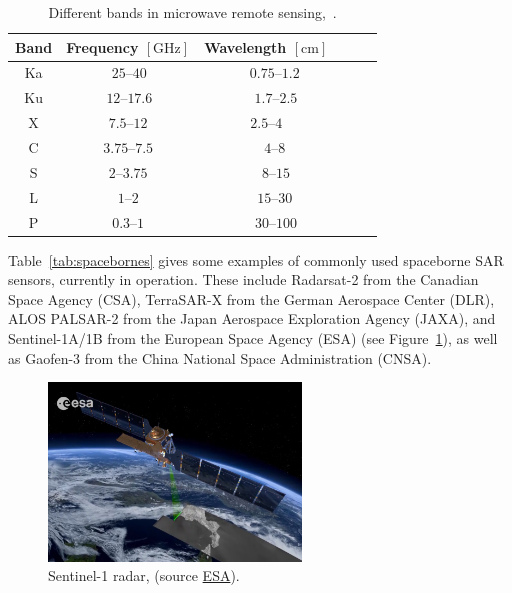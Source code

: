 \setlength{\tabcolsep}{6.0pt}
\begin{table}[!htb]
\caption[Different bands in microwave remote sensing]{\label{tab:bands}Different bands in microwave remote sensing,~\citep{Moreira2013}.}
\centering
\begin{tabular}[t]{cccccc}
\toprule
 \textbf{Band} & \multicolumn{1}{c}{\textbf{Frequency} $\left[\text{GHz}\right]$} & \multicolumn{1}{c}{\textbf{Wavelength} $\left[\text{cm}\right]$} \\
\midrule
Ka & $\,25$--$40$ & $\phantom{-}0.75$--$1.2$ \\
Ku & $\,12$--$17.6$ & $\phantom{-}\,1.7$--$2.5$ \\
X  & $7.5$--$12$  & $2.5$--$4$   \\
C  & $ 3.75$--$7.5$ & $\phantom{-}4$--$8$   \\
S  & $2$--$3.75$   & $\phantom{-}\,8$--$15$    \\
L  & $1$--$2$   & $\phantom{-}15$--$30$   \\
P  & $0.3$--$1$ & $\phantom{-}\,30$--$100$  \\
\bottomrule
\end{tabular}
\end{table}
Table~\ref{tab:spacebornes} gives some examples of commonly used spaceborne SAR sensors, currently in operation. 
These include Radarsat-2 from the Canadian Space Agency (CSA), TerraSAR-X from the German Aerospace Center (DLR), ALOS PALSAR-2 from the Japan Aerospace Exploration Agency (JAXA), and Sentinel-1A/1B from the European Space Agency (ESA) (see Figure~\ref{fig:Sentinel-1n}), as well as Gaofen-3 from the China National Space Administration (CNSA).
\begin{figure}[H]
    \centering
    \includegraphics[width=0.6\textwidth]{../../Images/PNG/ESA_radar.png}
    \caption[Sentinel-1 radar.]{Sentinel-1 radar, (source \href{https://www.esa.int/Applications/Observing_the_Earth/Copernicus/Sentinel-1/Changing_lands}{ESA}).}
    \label{fig:Sentinel-1n}
\end{figure}


